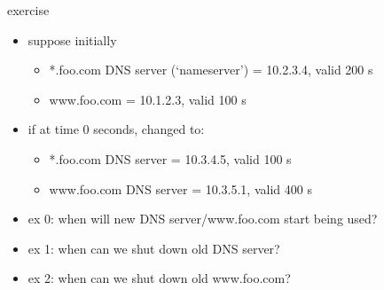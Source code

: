 \begin{frame}{exercise}
    \begin{itemize}
    \item suppose initially
        \begin{itemize}
        \item *.foo.com DNS server (`nameserver') = 10.2.3.4, valid 200 s
        \item www.foo.com = 10.1.2.3, valid 100 s
        \end{itemize}
    \item if at time 0 seconds, changed to:
        \begin{itemize}
        \item *.foo.com DNS server = 10.3.4.5, valid 100 s
        \item www.foo.com DNS server = 10.3.5.1, valid 400 s
        \end{itemize}
    \item ex 0: when will new DNS server/www.foo.com start being used?
    \item ex 1: when can we shut down old DNS server?
    \item ex 2: when can we shut down old www.foo.com?
    \end{itemize}
\end{frame}
